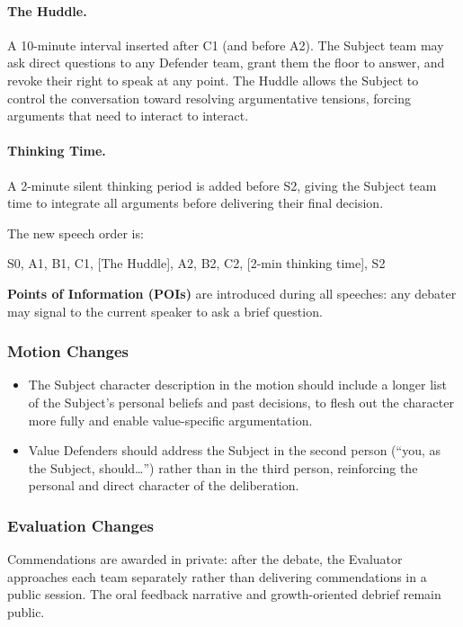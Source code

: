 \paragraph{The Huddle.} A 10-minute interval inserted after C1 (and before A2). The Subject team may ask direct questions to any Defender team, grant them the floor to answer, and revoke their right to speak at any point. The Huddle allows the Subject to control the conversation toward resolving argumentative tensions, forcing arguments that need to interact to interact.

\paragraph{Thinking Time.} A 2-minute silent thinking period is added before S2, giving the Subject team time to integrate all arguments before delivering their final decision.

The new speech order is:

\begin{center}
S0, A1, B1, C1, [The Huddle], A2, B2, C2, [2-min thinking time], S2
\end{center}

\textbf{Points of Information (POIs)} are introduced during all speeches: any debater may signal to the current speaker to ask a brief question.

\subsubsection{Motion Changes}

\begin{itemize}
    \item The Subject character description in the motion should include a longer list of the Subject's personal beliefs and past decisions, to flesh out the character more fully and enable value-specific argumentation.
    \item Value Defenders should address the Subject in the second person (``you, as the Subject, should\ldots'') rather than in the third person, reinforcing the personal and direct character of the deliberation.
\end{itemize}

\subsubsection{Evaluation Changes}

Commendations are awarded in private: after the debate, the Evaluator approaches each team separately rather than delivering commendations in a public session. The oral feedback narrative and growth-oriented debrief remain public.

